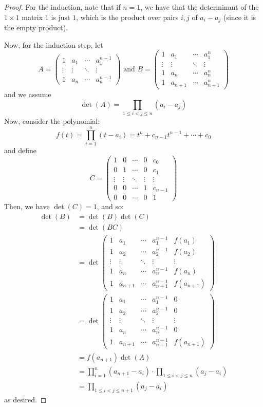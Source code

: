 \begin{proof}
    For the induction, note that if $n=1$, we have that the determinant of the $1 \times 1$ matrix $1$ is just $1$, which is the product over pairs $i,j$ of $a_i-a_j$ (since it is the empty product).

    Now, for the induction step, let
    \[ A = \left(\begin{array}{cccc} 1 & a_1 & \cdots & a_1^{n-1} \\ \vdots & \vdots & \ddots & \vdots \\ 1 & a_n & \cdots & a_n^{n-1} \end{array}\right) \text{  and  } B = \left(\begin{array}{cccc} 1 & a_1 & \cdots & a_1^n \\ \vdots & \vdots & \ddots & \vdots \\ 1 & a_n & \cdots & a_n^n \\ 1 & a_{n+1} & \cdots & a_{n+1}^n \end{array}\right) \]
    and we assume
    \[ \det(A) = \prod_{1 \leq i < j \leq n} (a_i-a_j) \]
    Now, consider the polynomial:
    \[ f(t) = \prod_{i=1}^n (t-a_i) = t^n+c_{n-1}t^{n-1}+\cdots+c_0 \]
    and define
    \[ C = \left(\begin{array}{ccccc} 1 & 0 & \cdots & 0 & c_0 \\ 0 & 1 & \cdots & 0 & c_1 \\ \vdots & \vdots & \ddots & \vdots & \vdots \\ 0 & 0 & \cdots & 1 & c_{n-1} \\ 0 & 0 & \cdots & 0 & 1 \end{array}\right) \]
    Then, we have $\det(C) = 1$, and so:
    \begin{align*}
    \det(B)
        &= \det(B)\det(C) \\
        &= \det(BC) \\
        &= \det\left(\begin{array}{ccccc} 1 & a_1 & \cdots & a_1^{n-1} & f(a_1) \\ 1 & a_2 & \cdots & a_2^{n-1} & f(a_2) \\ \vdots & \vdots & \ddots & \vdots & \vdots \\ 1 & a_n & \cdots & a_n^{n-1} & f(a_n) \\ 1 & a_{n+1} & \cdots & a_{n+1}^{n-1} & f(a_{n+1}) \end{array}\right) \\
        &= \det\left(\begin{array}{ccccc} 1 & a_1 & \cdots & a_1^{n-1} & 0 \\ 1 & a_2 & \cdots & a_2^{n-1} & 0 \\ \vdots & \vdots & \ddots & \vdots & \vdots \\ 1 & a_n & \cdots & a_n^{n-1} & 0 \\ 1 & a_{n+1} & \cdots & a_{n+1}^{n-1} & f(a_{n+1}) \end{array}\right) \\
        &= f(a_{n+1})\det(A) \\
        &= \prod_{i=1}^n (a_{n+1}-a_i) \cdot \prod_{1 \leq i < j \leq n} (a_j-a_i) \\
        &= \prod_{1 \leq i < j \leq n+1} (a_j-a_i)
    \end{align*}
    as desired.
\end{proof}

